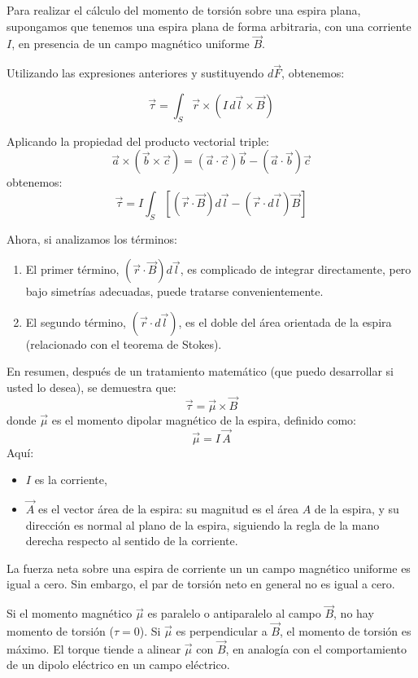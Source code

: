Para realizar el cálculo del momento de torsión sobre una espira plana, supongamos que tenemos una espira plana de forma arbitraria, con una corriente \(I\), en presencia de un campo magnético uniforme \(\vec{B}\).

Utilizando las expresiones anteriores y sustituyendo \(d\vec{F}\), obtenemos:

\[
\vec{\tau} = \int_S \vec{r} \times (I \, d\vec{l} \times \vec{B})
\]

Aplicando la propiedad del producto vectorial triple:
\[
\vec{a} \times (\vec{b} \times \vec{c}) = (\vec{a} \cdot \vec{c})\vec{b} - (\vec{a} \cdot \vec{b})\vec{c}
\]
obtenemos:
\[
\vec{\tau} = I \int_S \left[ (\vec{r} \cdot \vec{B}) d\vec{l} - (\vec{r} \cdot d\vec{l}) \vec{B} \right]
\]

Ahora, si analizamos los términos:
\begin{enumerate}
  \item El primer término, \( (\vec{r} \cdot \vec{B}) d\vec{l} \), es complicado de integrar directamente, pero bajo simetrías adecuadas, puede tratarse convenientemente.
  \item El segundo término, \((\vec{r} \cdot d\vec{l})\), es el doble del área orientada de la espira (relacionado con el teorema de Stokes).
\end{enumerate}

En resumen, después de un tratamiento matemático (que puedo desarrollar si usted lo desea), se demuestra que:
\[
\vec{\tau} = \vec{\mu} \times \vec{B}
\]
donde \(\vec{\mu}\) es el momento dipolar magnético de la espira, definido como:
\[
\vec{\mu} = I \, \vec{A}
\]
Aquí:
\begin{itemize}
  \item \(I\) es la corriente,
  \item \(\vec{A}\) es el vector área de la espira: su magnitud es el área \(A\) de la espira, y su dirección es normal al plano de la espira, siguiendo la regla de la mano derecha respecto al sentido de la corriente.
\end{itemize}

\begin{tcolorbox}[myconclusion]
  La fuerza neta sobre una espira de corriente un un campo magnético uniforme es igual a cero. Sin embargo, el par de torsión neto en general no es igual a cero.
\end{tcolorbox}

Si el momento magnético \(\vec{\mu}\) es paralelo o antiparalelo al campo \(\vec{B}\), no hay momento de torsión (\(\tau = 0\)). Si \(\vec{\mu}\) es perpendicular a \(\vec{B}\), el momento de torsión es máximo. El torque tiende a alinear \(\vec{\mu}\) con \(\vec{B}\), en analogía con el comportamiento de un dipolo eléctrico en un campo eléctrico.

